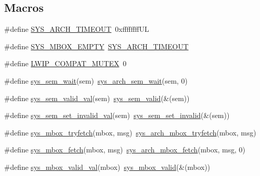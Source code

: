 \subsection*{Macros}
\begin{DoxyCompactItemize}
\item 
\#define \hyperlink{openmote-cc2538_2lwip_2src_2include_2lwip_2sys_8h_ac1495030a8ab5e1f3c89e42ced527c5b}{S\+Y\+S\+\_\+\+A\+R\+C\+H\+\_\+\+T\+I\+M\+E\+O\+UT}~0xffffffff\+UL
\item 
\#define \hyperlink{openmote-cc2538_2lwip_2src_2include_2lwip_2sys_8h_ab0571e67edca0132b144106e9b319ef9}{S\+Y\+S\+\_\+\+M\+B\+O\+X\+\_\+\+E\+M\+P\+TY}~\hyperlink{openmote-cc2538_2lwip_2src_2include_2lwip_2sys_8h_ac1495030a8ab5e1f3c89e42ced527c5b}{S\+Y\+S\+\_\+\+A\+R\+C\+H\+\_\+\+T\+I\+M\+E\+O\+UT}
\item 
\#define \hyperlink{openmote-cc2538_2lwip_2src_2include_2lwip_2sys_8h_a7bada49634cd3b28b28bdcedd763a1e6}{L\+W\+I\+P\+\_\+\+C\+O\+M\+P\+A\+T\+\_\+\+M\+U\+T\+EX}~0
\item 
\#define \hyperlink{openmote-cc2538_2lwip_2src_2include_2lwip_2sys_8h_a84e7e4bc00255aee84e6e7289a985703}{sys\+\_\+sem\+\_\+wait}(sem)~\hyperlink{group__sys__sem_ga8d364c5037778acb21c3df675db81b4f}{sys\+\_\+arch\+\_\+sem\+\_\+wait}(sem, 0)
\item 
\#define \hyperlink{openmote-cc2538_2lwip_2src_2include_2lwip_2sys_8h_a9e8ad541356786936f23ab83b8f550cc}{sys\+\_\+sem\+\_\+valid\+\_\+val}(sem)~\hyperlink{group__sys__sem_ga09a6c052ddaf799139efc56adfa087e4}{sys\+\_\+sem\+\_\+valid}(\&(sem))
\item 
\#define \hyperlink{openmote-cc2538_2lwip_2src_2include_2lwip_2sys_8h_a2556e570f6973a6f4d57d0e76ef190d8}{sys\+\_\+sem\+\_\+set\+\_\+invalid\+\_\+val}(sem)~\hyperlink{group__sys__sem_ga42a2ab32afbf41a4146a9d135224ef33}{sys\+\_\+sem\+\_\+set\+\_\+invalid}(\&(sem))
\item 
\#define \hyperlink{openmote-cc2538_2lwip_2src_2include_2lwip_2sys_8h_ab7841780b31ba9c0a39a440aad1fca13}{sys\+\_\+mbox\+\_\+tryfetch}(mbox,  msg)~\hyperlink{group__sys__mbox_gafab441b130b4ec417012835dbe1e497c}{sys\+\_\+arch\+\_\+mbox\+\_\+tryfetch}(mbox, msg)
\item 
\#define \hyperlink{openmote-cc2538_2lwip_2src_2include_2lwip_2sys_8h_a5bae9efa9c945dc810665dc4a7e60117}{sys\+\_\+mbox\+\_\+fetch}(mbox,  msg)~\hyperlink{group__sys__mbox_ga6464cd77cf6799bd8b3d6c840166a2e8}{sys\+\_\+arch\+\_\+mbox\+\_\+fetch}(mbox, msg, 0)
\item 
\#define \hyperlink{openmote-cc2538_2lwip_2src_2include_2lwip_2sys_8h_aae82640d0bdbeec7b9b6511b3f8d99cb}{sys\+\_\+mbox\+\_\+valid\+\_\+val}(mbox)~\hyperlink{group__sys__mbox_ga8bcfab4bd791dd33f69a778e7585275d}{sys\+\_\+mbox\+\_\+valid}(\&(mbox))

\end{DoxyCompactItemize}
